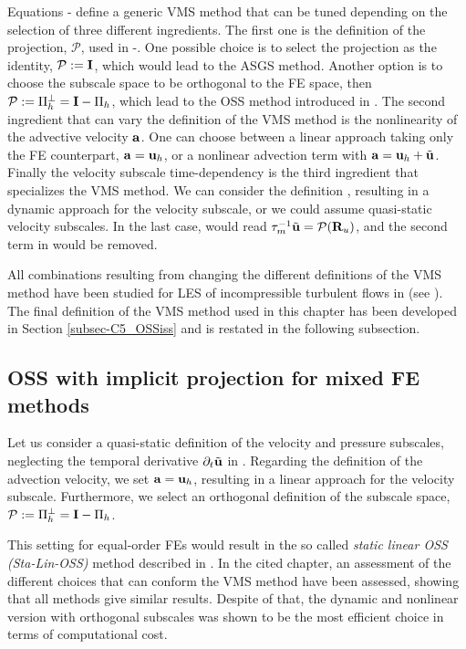 Equations - define a generic VMS method that can be tuned depending on the selection of three different ingredients. The first one is the definition of the projection, $ \mathcal{P} $, used in -. One possible choice is to select the projection as the identity, $\mathcal{P}:=\mathbf{I}$, which would lead to the ASGS method. Another option is to choose the subscale space to be orthogonal to the FE space, then $ \mathcal{P}:=\Pi^\perp_h=\mathbf{I}-\Pi_h $, which lead to the OSS method introduced in \cite{codina_stabilization_2000}. The second ingredient that can vary the definition of the VMS method is the nonlinearity of the advective velocity $ {\bf a} $. One can choose between a linear approach taking only the FE counterpart, $ {\bf a}={\bf u}_h $, or a nonlinear advection term with $ {\bf a}={\bf u}_h+\tilde{{\bf u}} $. Finally the velocity subscale time-dependency is the third ingredient that specializes the VMS method. We can consider the definition , resulting in a dynamic approach for the velocity subscale, or we could assume quasi-static velocity subscales. In the last case,  would read $ \tau_m^{-1}\tilde{{\bf u}}=\mathcal{P}({\bf R}_u)$, and the second term in  would be removed.

All combinations resulting from changing the different definitions of the VMS method have been studied for LES of incompressible turbulent flows in \cite{colomes_assessment_2015} (see ). The final definition of the VMS method used in this chapter has been developed in Section \ref{subsec-C5_OSSiss} and is restated in the following subsection.

\subsection{OSS with implicit projection for mixed FE methods}
\label{subsec-C7_OSS_mixed}
Let us consider a quasi-static definition of the velocity and pressure subscales, neglecting the temporal derivative $ \partial_t\tilde{{\bf u}} $ in . Regarding the definition of the advection velocity, we set $ {\bf a}={\bf u}_h $, resulting in a linear approach for the velocity subscale. Furthermore, we select an orthogonal definition of the subscale space, $ \mathcal{P}:=\Pi_h^\perp=\mathbf{I}-\Pi_h $.

This setting for equal-order FEs would result in the so called \textit{static linear OSS (Sta-Lin-OSS)} method described in . In the cited chapter, an assessment of the different choices that can conform the VMS method have been assessed, showing that all methods give similar results.  Despite of that, the dynamic and nonlinear version with orthogonal subscales was shown to be the most efficient choice in terms of computational cost.

